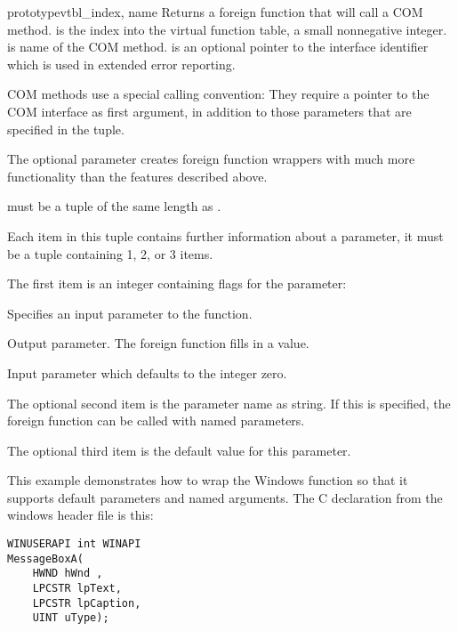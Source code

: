 \begin{funcdescni}{prototype}{vtbl_index, name}
Returns a foreign function that will call a COM method.
 is the index into the virtual function table, a
small nonnegative integer.  is name of the COM method.
 is an optional pointer to the interface identifier which
is used in extended error reporting.

COM methods use a special calling convention: They require a
pointer to the COM interface as first argument, in addition to
those parameters that are specified in the  tuple.
\end{funcdescni}

The optional  parameter creates foreign function
wrappers with much more functionality than the features described
above.

 must be a tuple of the same length as .

Each item in this tuple contains further information about a
parameter, it must be a tuple containing 1, 2, or 3 items.

The first item is an integer containing flags for the parameter:

\begin{datadescni}{1}
Specifies an input parameter to the function.
\end{datadescni}

\begin{datadescni}{2}
Output parameter.  The foreign function fills in a value.
\end{datadescni}

\begin{datadescni}{4}
Input parameter which defaults to the integer zero.
\end{datadescni}

The optional second item is the parameter name as string.  If this is
specified, the foreign function can be called with named parameters.

The optional third item is the default value for this parameter.

This example demonstrates how to wrap the Windows 
function so that it supports default parameters and named arguments.
The C declaration from the windows header file is this:
\begin{verbatim}
WINUSERAPI int WINAPI
MessageBoxA(
    HWND hWnd ,
    LPCSTR lpText,
    LPCSTR lpCaption,
    UINT uType);
\end{verbatim}

